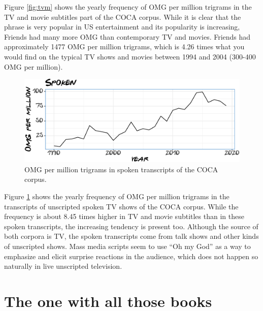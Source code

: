 \documentclass[]{article}
\begin{document}
Figure \ref{fig:tvm} shows the yearly frequency of OMG per million trigrams in the TV and movie subtitles part of the COCA corpus. While it is clear that the phrase is very popular in US entertainment and its popularity is increasing, Friends had many more OMG than contemporary TV and movies. Friends had approximately 1477 OMG per million trigrams, which is 4.26 times what you would find on the typical TV shows and movies between 1994 and 2004 (300-400 OMG per million).

\begin{figure}

{\centering \includegraphics{Friends_HPS_pdf_files/figure-latex/spoken-1} 

}

\caption{OMG per million trigrams in spoken transcripts of the COCA corpus.}\label{fig:spoken}
\end{figure}

Figure \ref{fig:spoken} shows the yearly frequency of OMG per million trigrams in the transcripts of unscripted spoken TV shows of the COCA corpus. While the frequency is about 8.45 times higher in TV and movie subtitles than in these spoken transcripts, the increasing tendency is present too. Although the source of both corpora is TV, the spoken transcripts come from talk shows and other kinds of unscripted shows. Mass media scripts seem to use ``Oh my God'' as a way to emphasize and elicit surprise reactions in the audience, which does not happen so naturally in live unscripted television.

\hypertarget{the-one-with-all-those-books}{%
\section{The one with all those books}\label{the-one-with-all-those-books}}
\end{document}
